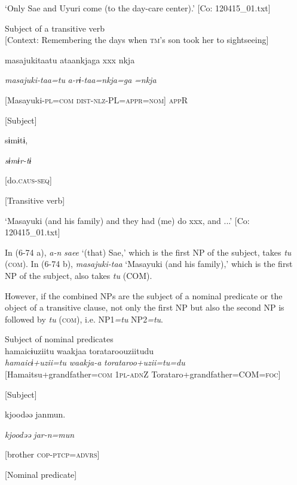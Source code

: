 \glt ‘Only Sae and Uyuri come (to the day-care center).’ [Co: 120415\_01.txt]
\z

 \ex Subject of a transitive verb\\{}
[Context: Remembering the days when \textsc{tm}’s son took her to sightseeing]

{\TM}
\gll masajukitaatu  ataankjaga  xxx  nkja

      \textit{masajuki-taa=tu}  \textit{a-rɨ-taa=nkja=ga}    \textit{=nkja}

      [Masayuki-\textsc{pl}=\textsc{com}  \textsc{dist}-\textsc{nlz}-PL=\textsc{appr}=\textsc{nom}]    \textsc{app}R

      [Subject]    

      sɨmɨtɨ,

      \textit{sɨmɨr-tɨ}

      [do.\textsc{caus}-\textsc{seq}]

      [Transitive verb]

\glt ‘Masayuki (and his family) and they had (me) do xxx, and ...’ [Co: 120415\_01.txt]
\z

In (6-74 a), \textit{a-n} \textit{saee} ‘(that) Sae,’ which is the first NP of the subject, takes \textit{tu} (\textsc{com}). In (6-74 b), \textit{masajuki-taa} ‘Masayuki (and his family),’ which is the first NP of the subject, also takes \textit{tu} (COM).

  However, if the combined NPs are the subject of a nominal predicate or the object of a transitive clause, not only the first NP but also the second NP is followed by \textit{tu} (\textsc{com}), i.e. NP1\textit{=tu} NP2\textit{=tu}.

\ea\label{ex:6-75}
 Subject of nominal predicates\\

 \ea {\TM}  hamaicɨuziitu  waakjaa  torataroouziitudu\\
\gll \textit{hamaicɨ+uzii=tu}  \textit{waakja-a}  \textit{torataroo+uzii=tu=du}\\

      [Hamaitsu+grandfather=\textsc{com}  1\textsc{pl}-\textsc{adn}Z  Torataro+grandfather=COM=\textsc{foc}]

      [Subject]

      kjoodəə  janmun.

      \textit{kjoodəə}  \textit{jar-n=mun}

      [brother  \textsc{cop}-\textsc{ptcp}=\textsc{advrs}]

      [Nominal predicate]

